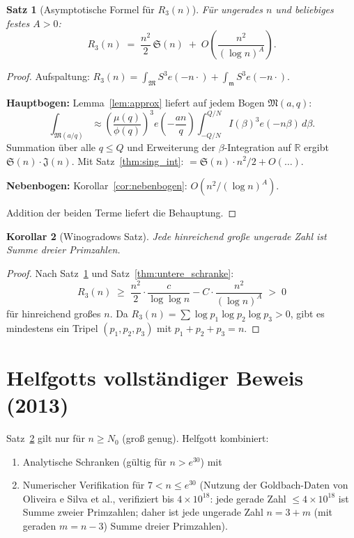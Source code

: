 \documentclass[12pt,a4paper]{amsart}
\newtheorem{theorem}{Satz}[section]
\newtheorem{korollar}[theorem]{Korollar}
\theoremstyle{definition}
\newcommand{\R}{\mathbb{R}}
\newcommand{\eq}[1]{e\!\left(#1\right)}
\begin{document}
\begin{theorem}[Asymptotische Formel für $R_3(n)$]\label{thm:asymptotisch}
  Für ungerades $n$ und beliebiges festes $A > 0$:
  \[
    R_3(n)
    \;=\; \frac{n^2}{2}\, \mathfrak{S}(n)
          \;+\; O\!\left(\frac{n^2}{(\log n)^A}\right).
  \]
\end{theorem}

\begin{proof}
  Aufspaltung:
  $R_3(n) = \int_{\mathfrak{M}} S^3 \eq{-n\cdot} + \int_{\mathfrak{m}} S^3 \eq{-n\cdot}$.

  \textbf{Hauptbogen:}  Lemma~\ref{lem:approx} liefert auf jedem
  Bogen $\mathfrak{M}(a,q)$:
  \[
    \int_{\mathfrak{M}(a/q)} \approx
    \left(\frac{\mu(q)}{\phi(q)}\right)^3 \eq{-\frac{an}{q}}
    \int_{-Q/N}^{Q/N} I(\beta)^3 \eq{-n\beta}\, d\beta.
  \]
  Summation über alle $q \leq Q$ und Erweiterung der $\beta$-Integration
  auf $\R$ ergibt $\mathfrak{S}(n) \cdot \mathfrak{J}(n)$.
  Mit Satz~\ref{thm:sing_int}: $= \mathfrak{S}(n) \cdot n^2/2 + O(\ldots)$.

  \textbf{Nebenbogen:}  Korollar~\ref{cor:nebenbogen}: $O(n^2/(\log n)^A)$.

  Addition der beiden Terme liefert die Behauptung.
\end{proof}

\begin{korollar}[Winogradows Satz]\label{cor:winogradow}
  Jede hinreichend große ungerade Zahl ist Summe dreier Primzahlen.
\end{korollar}

\begin{proof}
  Nach Satz~\ref{thm:asymptotisch} und Satz~\ref{thm:untere_schranke}:
  \[
    R_3(n) \;\geq\; \frac{n^2}{2} \cdot \frac{c}{\log\log n}
                    - C \cdot \frac{n^2}{(\log n)^A} \;>\; 0
  \]
  für hinreichend großes $n$.  Da $R_3(n) = \sum \log p_1 \log p_2 \log p_3 > 0$,
  gibt es mindestens ein Tripel $(p_1, p_2, p_3)$ mit $p_1 + p_2 + p_3 = n$.
\end{proof}

\section{Helfgotts vollständiger Beweis (2013)}
\label{sec:helfgott}

Satz~\ref{cor:winogradow} gilt nur für $n \geq N_0$ (groß genug).
Helfgott kombiniert:
\begin{enumerate}
  \item Analytische Schranken (gültig für $n > e^{30}$) mit
  \item Numerischer Verifikation für $7 < n \leq e^{30}$
    (Nutzung der Goldbach-Daten von Oliveira e Silva et al., verifiziert
    bis $4 \times 10^{18}$: jede gerade Zahl $\leq 4 \times 10^{18}$
    ist Summe zweier Primzahlen; daher ist jede ungerade Zahl
    $n = 3 + m$ (mit geraden $m = n-3$) Summe dreier Primzahlen).
\end{enumerate}
\end{document}
